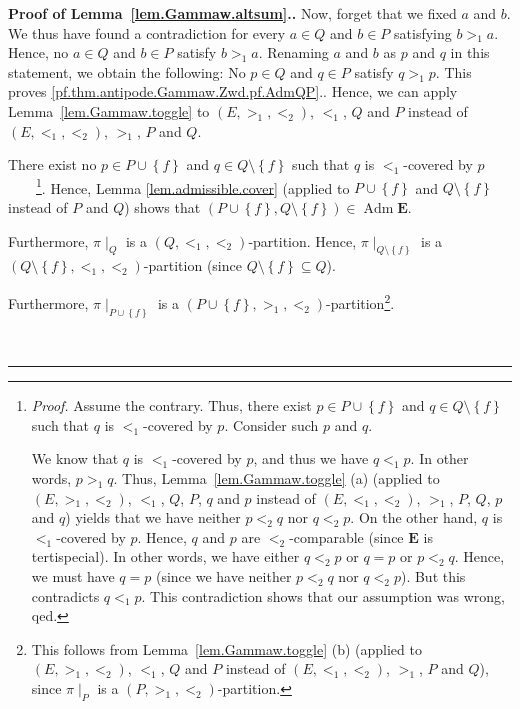 \documentclass[numbers=enddot,12pt,final,onecolumn,notitlepage,abstracton]{scrartcl}%
\theoremstyle{definition}
\newenvironment{proof}[1][Proof]{\noindent\textbf{#1.} }{\ \rule{0.5em}{0.5em}}
\newcommand{\Adm}{\operatorname{Adm}}
\newcommand{\EE}{{\mathbf{E}}}
\begin{document}
\begin{proof}[Proof of Lemma~\ref{lem.Gammaw.altsum}.]
{Now, forget that we fixed $a$ and $b$. We thus have found a
contradiction for every $a \in Q$ and $b \in P$ satisfying
$b >_1 a$. Hence, no $a \in Q$ and $b \in P$ satisfy $b >_1 a$.
Renaming $a$ and $b$ as $p$ and $q$ in this statement, we obtain
the following: No $p \in Q$ and $q \in P$ satisfy $q >_1 p$.
This proves \eqref{pf.thm.antipode.Gammaw.Zwd.pf.AdmQP}.}.
Hence, we can apply Lemma~\ref{lem.Gammaw.toggle} to
$\left(E, >_1, <_2\right)$, $<_1$, $Q$ and $P$ instead of
$\left(E, <_1, <_2\right)$, $>_1$, $P$ and $Q$.

There exist no $p\in P\cup\left\{  f\right\}  $ and $q\in
Q\setminus\left\{  f\right\}  $ such that $q$ is $<_{1}$-covered by
$p$\ \ \ \ \footnote{\textit{Proof.} Assume the contrary. Thus, there exist
$p\in P\cup\left\{  f\right\}  $ and $q\in Q\setminus\left\{  f\right\}  $
such that $q$ is $<_{1}$-covered by $p$. Consider such $p$ and $q$.
\par
We know that $q$ is $<_1$-covered by $p$, and thus we have
$q <_1 p$. In other words, $p >_1 q$. Thus,
Lemma~\ref{lem.Gammaw.toggle} (a) (applied to
$\left(E, >_1, <_2\right)$, $<_1$, $Q$, $P$, $q$ and $p$ instead of
$\left(E, <_1, <_2\right)$, $>_1$, $P$, $Q$, $p$ and $q$) yields
that we have neither $p <_2 q$ nor $q <_2 p$.
On the other hand,
$q$ is $<_{1}$-covered by $p$. Hence, $q$ and $p$ are
$<_{2}$-comparable (since $\EE$ is tertispecial).
In other words, we have either $q <_2 p$ or $q = p$ or $p <_2 q$.
Hence, we must have $q = p$ (since we have neither $p <_2 q$
nor $q <_2 p$). But this contradicts $q <_1 p$.
This contradiction shows that our
assumption was wrong, qed.}. Hence, Lemma \ref{lem.admissible.cover} (applied
to $P\cup\left\{  f\right\}  $ and $Q\setminus\left\{  f\right\}  $ instead of
$P$ and $Q$) shows that $\left(  P\cup\left\{  f\right\}  ,Q\setminus\left\{
f\right\}  \right)  \in \Adm \EE$.

Furthermore, $\pi\mid_{Q}$ is a $\left(  Q,<_{1},<_{2}\right)  $-partition.
Hence, $\pi\mid_{Q\setminus\left\{  f\right\}  }$ is a $\left(
Q\setminus\left\{  f\right\}  ,<_{1},<_{2}\right)  $-partition (since
$Q\setminus\left\{  f\right\}  \subseteq Q$).

Furthermore, $\pi\mid_{P\cup\left\{  f\right\}  }$ is a $\left(  P\cup\left\{
f\right\}  ,>_{1},<_{2}\right)  $-partition\footnote{This follows from
Lemma~\ref{lem.Gammaw.toggle} (b) (applied to
$\left(E, >_1, <_2\right)$, $<_1$, $Q$ and $P$ instead of
$\left(E, <_1, <_2\right)$, $>_1$, $P$ and $Q$), since $\pi\mid_P$ is a
$\left(P, >_1, <_2\right)$-partition.}.


\end{proof}
\end{document}
